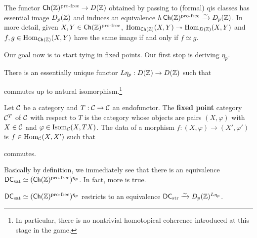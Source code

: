 \documentclass[11pt]{article}
\newcommand{\DC}{\mathsf{DC}} %
\newcommand{\Isom}{\textup{Isom}} %
\newcommand{\pf}{\textup{pro-free}} %
\newcommand{\sat}{\textup{sat}} %
\newcommand{\str}{\textup{str}} %
\renewcommand{\phi}{\varphi}
\begin{document}
\begin{theorem}
The functor $\Ch(\Z)^{\pf}\to D(\Z)$ obtained by passing to (formal) qis classes has essential image $D_p(\mathbb{Z})$ and induces an equivalence $h\Ch(\Z)^{\pf}\xto{\sim}D_p(\Z)$. In more detail, given $X,Y\in\Ch(\Z)^{\pf}$, $\operatorname{Hom}_{\operatorname{\mathsf{Ch}}(\mathbb{Z})}(X,Y)\twoheadrightarrow\operatorname{Hom}_{D(\mathbb{Z})}(X,Y)$ and $f,g\in\operatorname{Hom}_{\operatorname{\mathsf{Ch}}(\mathbb{Z})}(X,Y)$ have the same image if and only if $f\simeq g$.
\end{theorem}

Our goal now is to start tying in fixed points. Our first stop is deriving $\eta_p$.

\begin{proposition}
There is an essentially unique functor $L\eta_p: D(\mathbb{Z})\to D(\mathbb{Z})$ such that
\begin{center}
\end{center}
commutes up to natural isomorphism.\footnote{In particular, there is no nontrivial homotopical coherence introduced at this stage in the game.}
\end{proposition}

\begin{definition}
Let $\mathcal{C}$ be a category and $T: \mathcal{C}\to\mathcal{C}$ an endofunctor. The \textbf{fixed point} category $\mathcal{C}^T$ of $\mathcal{C}$ with respect to $T$ is the category whose objects are pairs $(X,\phi)$ with $X\in\mathcal{C}$ and $\phi\in\Isom_{\mc{C}}(X,TX)$. The data of a morphism $f: (X,\phi)\to(X',\phi')$ is $f\in\operatorname{Hom}_{\mathcal{C}}(X,X')$ such that
\begin{center}
\end{center}
commutes.
\end{definition}

Basically by definition, we immediately see that there is an equivalence $\DC_{\sat}\simeq(\Ch(\Z)^{\pf})^{\eta_p}$. In fact, more is true.

\begin{theorem}
$\DC_{\sat}\simeq(\Ch(\Z)^{\pf})^{\eta_p}$ restricts to an equivalence $\DC_{\str}\xto{\sim}D_p(\Z)^{L\eta_p}$.
\end{theorem}
\end{document}
